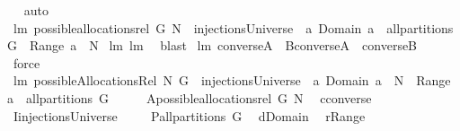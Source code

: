 \begin{isabellebody}
\isadelimproof
\ %
\endisadelimproof
%
\isatagproof
{}\isamarkupfalse%
\ auto%
\endisatagproof
{\isafoldproof}%
%
\isadelimproof
%
\endisadelimproof
\isanewline
\isanewline
{}\isamarkupfalse%
\ lm{}{}{\isacharcolon}\ {\isachardoublequoteopen}possible{\isacharunderscore}allocations{\isacharunderscore}rel\ G\ N\ {\isacharequal}\ injectionsUniverse\ {\isasyminter}\ {\isacharbraceleft}a{\isachardot}\ Domain\ a\ {\isasymin}\ all{\isacharunderscore}partitions\ G\ {\isacharampersand}\ Range\ a\ {\isasymsubseteq}\ N{\isacharbraceright}{\isachardoublequoteclose}\isanewline
%
\isadelimproof
%
\endisadelimproof
%
\isatagproof
{}\isamarkupfalse%
\ lm{}{}\ lm{}{}\ \isamarkupfalse%
\ blast%
\endisatagproof
{\isafoldproof}%
%
\isadelimproof
\isanewline
%
\endisadelimproof
\isanewline
{}\isamarkupfalse%
\ lm{}{}{\isacharcolon}\ {\isachardoublequoteopen}converse{\isacharbackquote}{\isacharparenleft}A\ {\isasyminter}\ B{\isacharparenright}{\isacharequal}converse{\isacharbackquote}A\ {\isasyminter}\ {\isacharparenleft}converse{\isacharbackquote}B{\isacharparenright}{\isachardoublequoteclose}%
\isadelimproof
\ %
\endisadelimproof
%
\isatagproof
{}\isamarkupfalse%
\ force%
\endisatagproof
{\isafoldproof}%
%
\isadelimproof
%
\endisadelimproof
\isanewline
\isanewline
{}\isamarkupfalse%
\ lm{}{}{\isacharcolon}\ {\isachardoublequoteopen}possibleAllocationsRel\ N\ G\ {\isacharequal}\ injectionsUniverse\ {\isasyminter}\ {\isacharbraceleft}a{\isachardot}\ Domain\ a\ {\isasymsubseteq}\ N\ {\isacharampersand}\ Range\ a\ {\isasymin}\ all{\isacharunderscore}partitions\ G{\isacharbraceright}{\isachardoublequoteclose}\isanewline
%
\isadelimproof
%
\endisadelimproof
%
\isatagproof
{}\isamarkupfalse%
\ {\isacharminus}\isanewline
\ \ \isamarkupfalse%
\ {\isacharquery}A{\isacharequal}{\isachardoublequoteopen}possible{\isacharunderscore}allocations{\isacharunderscore}rel\ G\ N{\isachardoublequoteclose}\ \isamarkupfalse%
\ {\isacharquery}c{\isacharequal}converse\ \isamarkupfalse%
\ {\isacharquery}I{\isacharequal}injectionsUniverse\ \isanewline
\ \ \isamarkupfalse%
\ {\isacharquery}P{\isacharequal}{\isachardoublequoteopen}all{\isacharunderscore}partitions\ G{\isachardoublequoteclose}\ \isamarkupfalse%
\ {\isacharquery}d{\isacharequal}Domain\ \isamarkupfalse%
\ {\isacharquery}r{\isacharequal}Range\isanewline

\end{isabellebody}
